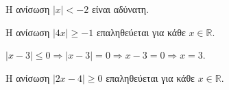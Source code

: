 \begin{alist}
\item Η ανίσωση $ |x|<-2 $ είναι αδύνατη.
\item Η ανίσωση $ |4x|\geq-1 $ επαληθεύεται για κάθε $ x\in\mathbb{R} $.
\item $ |x-3|\leq 0\Rightarrow |x-3|=0\Rightarrow x-3=0\Rightarrow x=3 $.
\item Η ανίσωση $ |2x-4|\geq 0 $ επαληθεύεται για κάθε $ x\in\mathbb{R} $.
\end{alist}
